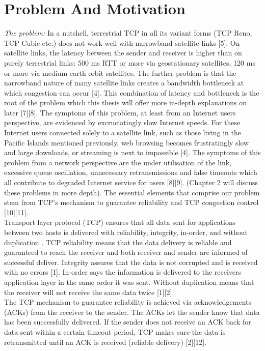 \documentclass{uathesis}
\begin{document}
\section{Problem And Motivation}

\emph{The problem:} In a nutshell, terrestrial TCP in all its variant forms (TCP Reno, TCP Cubic etc.) does not work well with narrowband satellite links [5]. On satellite links, the latency between the sender and receiver is higher than on purely terrestrial links: 500 ms RTT or more via geostationary satellites, 120 ms or more via medium earth orbit satellites. The further problem is that the narrowband nature of many satellite links creates a bandwidth bottleneck at which congestion can occur [4]. This combination of latency and bottleneck is the root of the problem which this thesis will offer more in-depth explanations on later [7][8]. The symptoms of this problem, at least from an Internet users perspective, are evidenced by excruciatingly slow Internet speeds. For these Internet users connected solely to a satellite link, such as those living in the Pacific Islands mentioned previously, web browsing becomes frustratingly slow and large downloads, or streaming is next to impossible [4]. The symptoms of this problem from a network perspective are the under utilisation of the link, excessive queue oscillation, unnecessary retransmissions and false timeouts which all contribute to degraded Internet service for users [8][9]. (Chapter 2 will discuss these problems in more depth). The essential elements that comprise our problem stem from TCP's mechanism to guarantee reliability and TCP congestion control [10][11]. \\

Transport layer protocol (TCP) ensures that all data sent for applications between two hosts is delivered with reliability, integrity, in-order, and without duplication . TCP reliability means that the data delivery is reliable and guaranteed to reach the receiver and both receiver and sender are informed of successful deliver. Integrity assures that the data is not corrupted and is received with no errors [1]. In-order says the information is delivered to the receivers application layer in the same order it was sent. Without duplication means that the receiver will not receive the same data twice [1][2]. \\

The TCP mechanism to guarantee reliability is achieved via acknowledgements (ACKs) from the receiver to the sender. The ACKs let the sender know that data has been successfully delivered. If the sender does not receive an ACK back for data sent within a certain timeout period, TCP makes sure the data is retransmitted until an ACK is received (reliable delivery) [2][12]. \\
\end{document}

